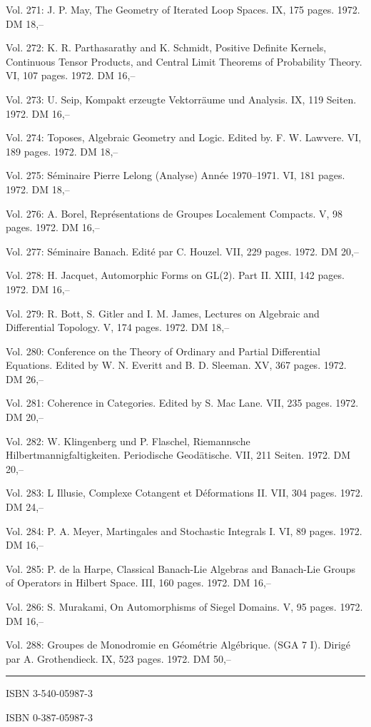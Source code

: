 Vol. 271: J. P. May, The Geometry of Iterated Loop Spaces. IX, 175 pages. 1972. DM 18,--

Vol. 272: K. R. Parthasarathy and K. Schmidt, Positive Definite Kernels, Continuous Tensor Products, and Central Limit Theorems of Probability Theory. VI, 107 pages. 1972. DM 16,--

Vol. 273: U. Seip, Kompakt erzeugte Vektorräume und Analysis. IX, 119 Seiten. 1972. DM 16,--

Vol. 274: Toposes, Algebraic Geometry and Logic. Edited by. F. W. Lawvere. VI, 189 pages. 1972. DM 18,--

Vol. 275: Séminaire Pierre Lelong (Analyse) Année 1970--1971. VI, 181 pages. 1972. DM 18,--

Vol. 276: A. Borel, Représentations de Groupes Localement Compacts. V, 98 pages. 1972. DM 16,--

Vol. 277: Séminaire Banach. Edité par C. Houzel. VII, 229 pages. 1972. DM 20,--

Vol. 278: H. Jacquet, Automorphic Forms on GL(2). Part II. XIII, 142 pages. 1972. DM 16,--

Vol. 279: R. Bott, S. Gitler and I. M. James, Lectures on Algebraic and Differential Topology. V, 174 pages. 1972. DM 18,--

Vol. 280: Conference on the Theory of Ordinary and Partial Differential Equations. Edited by W. N. Everitt and B. D. Sleeman. XV, 367 pages. 1972. DM 26,--

Vol. 281: Coherence in Categories. Edited by S. Mac Lane. VII, 235 pages. 1972. DM 20,--

Vol. 282: W. Klingenberg und P. Flaschel, Riemannsche Hilbertmannigfaltigkeiten. Periodische Geodätische. VII, 211 Seiten. 1972. DM 20,--

Vol. 283: L Illusie, Complexe Cotangent et Déformations II. VII, 304 pages. 1972. DM 24,--

Vol. 284: P. A. Meyer, Martingales and Stochastic Integrals I. VI, 89 pages. 1972. DM 16,--

Vol. 285: P. de la Harpe, Classical Banach-Lie Algebras and Banach-Lie Groups of Operators in Hilbert Space. III, 160 pages. 1972. DM 16,--

Vol. 286: S. Murakami, On Automorphisms of Siegel Domains. V, 95 pages. 1972. DM 16,--

Vol. 288: Groupes de Monodromie en Géométrie Algébrique. (SGA 7 I). Dirigé par A. Grothendieck. IX, 523 pages. 1972. DM 50,--

\noindent\rule{\linewidth}{0.4pt}



ISBN 3-540-05987-3

ISBN 0-387-05987-3
\endgroup

